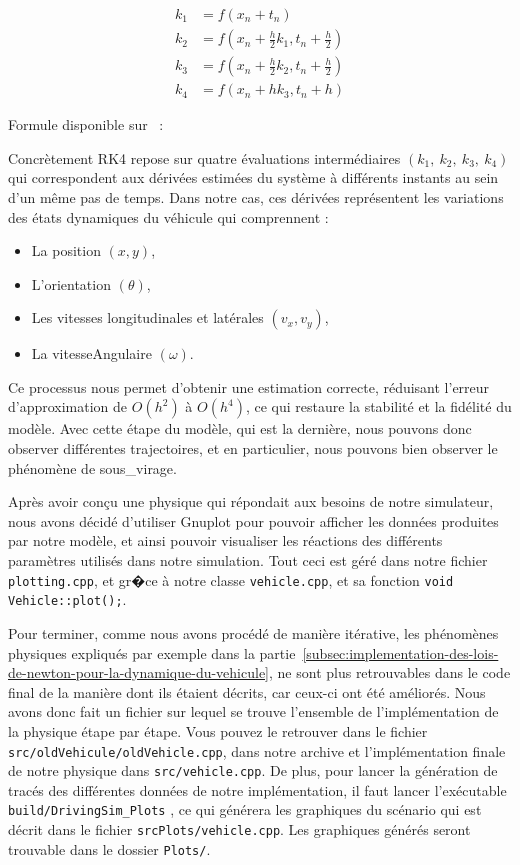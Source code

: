 \begin{align}
    k_1 &= f(x_n+t_n)\\
    k_2 &= f(x_n+ {\frac{h}{2}}k_1, t_n + {\frac{h}{2}})\\
    k_3 &= f(x_n+ {\frac{h}{2}}k_2, t_n + {\frac{h}{2}})\\
    k_4 &= f(x_n+ hk_3, t_n + h)
\end{align}
\begin{center}
    Formule disponible sur ~\cite{RK4}:
\end{center}
Concrètement RK4 repose sur quatre évaluations intermédiaires $(k_1, \ k_2, \ k_3, \ k_4)$ qui correspondent aux
dérivées estimées du système à différents instants au sein d'un même pas de temps.
Dans notre cas, ces dérivées
représentent les variations des états dynamiques du véhicule qui comprennent :

\begin{itemize}
    \item La position $(x,y)$,
    \item L'orientation $(\theta)$,
    \item Les vitesses longitudinales et latérales $(v_x, v_y)$,
    \item La \gls{vitesseAngulaire} $(\omega)$.
\end{itemize}

Ce processus nous permet d'obtenir une estimation correcte, réduisant l'erreur d'approximation de $O(h^2)$ à $O(h^4)$, ce qui restaure la stabilité et la fidélité du modèle.
Avec cette étape du modèle, qui est la dernière, nous pouvons donc observer différentes trajectoires, et en particulier, nous pouvons bien observer le phénomène de \gls{sous_virage}.

Après avoir conçu une physique qui répondait aux besoins de notre simulateur, nous avons décidé d'utiliser \gls{Gnuplot} pour pouvoir afficher les données produites par notre modèle, et ainsi pouvoir visualiser les réactions des différents paramètres utilisés dans notre simulation.
Tout ceci est géré dans notre fichier \texttt{plotting.cpp}, et gr�ce à notre classe \texttt{vehicle.cpp}, et sa fonction \texttt{void Vehicle::plot();}.

Pour terminer, comme nous avons procédé de manière itérative, les phénomènes physiques expliqués par exemple dans la partie~\ref{subsec:implementation-des-lois-de-newton-pour-la-dynamique-du-vehicule}, ne sont plus retrouvables dans le code final de la manière dont ils étaient décrits, car ceux-ci ont été améliorés.
Nous avons donc fait un fichier sur lequel se trouve l'ensemble de l'implémentation de la physique étape par étape.
Vous pouvez le retrouver dans le fichier \texttt{src/oldVehicule/oldVehicle.cpp}, dans notre archive et l'implémentation finale de notre physique dans \texttt{src/vehicle.cpp}.
De plus, pour lancer la génération de tracés des différentes données de notre implémentation, il faut lancer l'exécutable \texttt{build/DrivingSim\_Plots} , ce qui générera les graphiques du scénario qui est décrit dans le fichier \texttt{srcPlots/vehicle.cpp}.
Les graphiques générés seront trouvable dans le dossier \texttt{Plots/}.